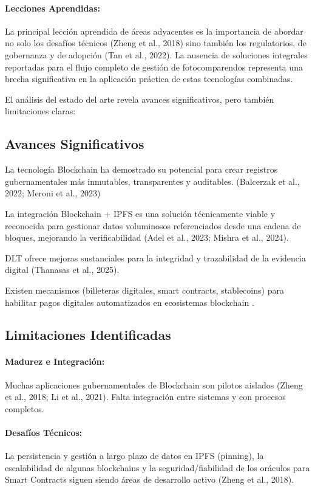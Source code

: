 \paragraph{Lecciones Aprendidas:} La principal lección aprendida de áreas adyacentes es la importancia de abordar no solo los desafíos técnicos (Zheng et al., 2018) sino también los regulatorios, de gobernanza y de adopción (Tan et al., 2022). La ausencia de soluciones integrales reportadas para el flujo completo de gestión de fotocomparendos representa una brecha significativa en la aplicación práctica de estas tecnologías combinadas.

El análisis del estado del arte revela avances significativos, pero también limitaciones claras: 
  

\subsection{Avances Significativos} 

La tecnología Blockchain ha demostrado su potencial para crear registros gubernamentales más inmutables, transparentes y auditables. (Balcerzak et al., 2022; Meroni et al., 2023) 

La integración Blockchain + IPFS es una solución técnicamente viable y reconocida para gestionar datos voluminosos referenciados desde una cadena de bloques, mejorando la verificabilidad (Adel et al., 2023; Mishra et al., 2024). 

DLT ofrece mejoras sustanciales para la integridad y trazabilidad de la evidencia digital (Thanasas et al., 2025). 

Existen mecanismos (billeteras digitales, smart contracts, stablecoins) para habilitar pagos digitales automatizados en ecosistemas blockchain \parencite{antonopoulos2023mastering}.

\subsection{Limitaciones Identificadas} 
\paragraph{Madurez e Integración:}
Muchas aplicaciones gubernamentales de Blockchain son pilotos aislados (Zheng et al., 2018; Li et al., 2021). Falta integración entre sistemas y con procesos completos. 

\paragraph{Desafíos Técnicos: }
La persistencia y gestión a largo plazo de datos en IPFS (pinning), la escalabilidad de algunas blockchains y la seguridad/fiabilidad de los oráculos para Smart Contracts siguen siendo áreas de desarrollo activo (Zheng et al., 2018). 

